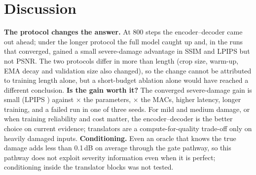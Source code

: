 \documentclass[conference]{IEEEtran}
\begin{document}
\section{Discussion}
\textbf{The protocol changes the answer.} At 800 steps the encoder--decoder came out ahead; under the longer
protocol the full model caught up and, in the runs that converged, gained a small severe-damage advantage in SSIM
and LPIPS but not PSNR. The two protocols differ in more than length (crop size, warm-up, EMA decay and validation
size also changed), so the change cannot be attributed to training length alone, but a short-budget ablation
alone would have reached a different conclusion.
\textbf{Is the gain worth it?} The converged severe-damage gain is small (LPIPS \nSevLPIPSgain{}) against
\nParamRatio$\times$ the parameters, \nMACsRatio$\times$ the MACs, higher latency, longer training, and a failed
run in one of three seeds. For mild and medium damage, or when training reliability and cost matter, the
encoder--decoder is the better choice on current evidence; translators are a compute-for-quality trade-off only on
heavily damaged inputs.
\textbf{Conditioning.} Even an oracle that knows the true damage adds less than 0.1\,dB on average through the
gate pathway, so this pathway does not exploit severity information even when it is perfect; conditioning inside
the translator blocks was not tested.
\end{document}
